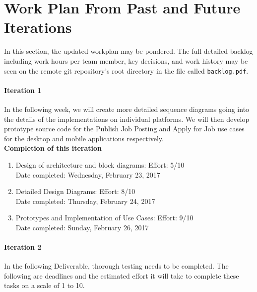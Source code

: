 \documentclass[12pt]{report}
\begin{document}
\part{Work Plan From Past and Future Iterations}
In this section, the updated workplan may be pondered. The full detailed backlog including work
hours per team member, key decisions, and work history may be seen on the remote git repository's
root directory in the file called \texttt{backlog.pdf}.
\subsection{Iteration 1}

In the following week, we will create more detailed sequence diagrams going into the details of the
implementations on individual platforms. We will then develop prototype source code for the Publish
Job Posting and Apply for Job use cases for the desktop and mobile applications respectively.\\

\textbf{Completion of this iteration}\\
\begin{enumerate}
	\item Design of architecture and block diagrams: Effort: 5/10\\Date completed: Wednesday,
		February 23, 2017
	\item Detailed Design Diagrams: Effort: 8/10\\Date completed: Thursday, February 24, 2017
	\item Prototypes and Implementation of Use Cases: Effort: 9/10\\Date completed: Sunday, February
		26, 2017
\end{enumerate}

\subsection{Iteration 2}

In the following Deliverable, thorough testing needs to be completed. The following are deadlines
and the estimated effort it will take to complete these tasks on a scale of 1 to 10.
\end{document}
